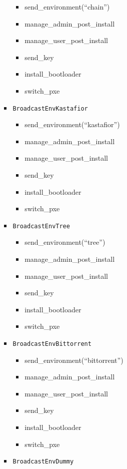\documentclass[a4wide,10pt,oneside]{book}
\begin{document}
\begin{itemize}
\begin{itemize}
\begin{itemize}
        \begin{itemize}
        \item send\_environment(``chain'')
        \item manage\_admin\_post\_install
        \item manage\_user\_post\_install
        \item send\_key
        \item install\_bootloader
        \item switch\_pxe
        \end{itemize}
      \item \texttt{BroadcastEnvKastafior}
        \begin{itemize}
        \item send\_environment(``kastafior'')
        \item manage\_admin\_post\_install
        \item manage\_user\_post\_install
        \item send\_key
        \item install\_bootloader
        \item switch\_pxe
        \end{itemize}
      \item \texttt{BroadcastEnvTree}
        \begin{itemize}
        \item send\_environment(``tree'')
        \item manage\_admin\_post\_install
        \item manage\_user\_post\_install
        \item send\_key
        \item install\_bootloader
        \item switch\_pxe
        \end{itemize}
      \item \texttt{BroadcastEnvBittorrent}
        \begin{itemize}
        \item send\_environment(``bittorrent'')
        \item manage\_admin\_post\_install
        \item manage\_user\_post\_install
        \item send\_key
        \item install\_bootloader
        \item switch\_pxe
        \end{itemize}
      \item \texttt{BroadcastEnvDummy}

\end{itemize}
\end{itemize}
\end{itemize}
\end{document}
